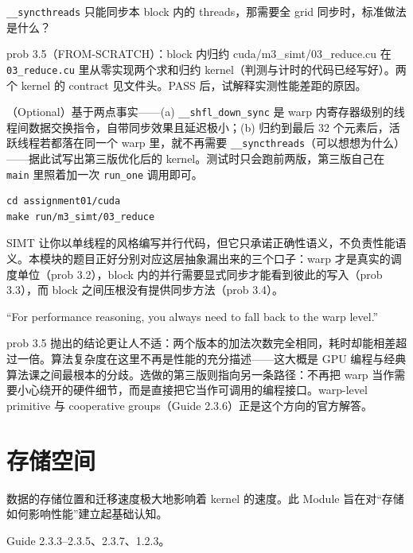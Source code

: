 \documentclass[11pt,a4paper,fontset=none]{ctexart}
\begin{document}
\texttt{\_\_syncthreads} 只能同步本 block 内的 threads，那需要全 grid 同步时，标准做法是什么？

\begin{capstone}{prob 3.5（FROM-SCRATCH）：block 内归约 \hfill {\footnotesize\ttfamily cuda/m3\_simt/03\_reduce.cu}}
在 \texttt{03\_reduce.cu} 里从零实现两个求和归约 kernel（判测与计时的代码已经写好）。两个 kernel 的 contract 见文件头。PASS 后，试解释实测性能差距的原因。

（Optional）基于两点事实——(a) \texttt{\_\_shfl\_down\_sync} 是 warp 内寄存器级别的线程间数据交换指令，自带同步效果且延迟极小；(b) 归约到最后 32 个元素后，活跃线程若都落在同一个 warp 里，就不再需要 \texttt{\_\_syncthreads}（可以想想为什么）——据此试写出第三版优化后的 kernel。测试时只会跑前两版，第三版自己在 \texttt{main} 里照着加一次 \texttt{run\_one} 调用即可。
\end{capstone}

\begin{lstlisting}
cd assignment01/cuda
make run/m3_simt/03_reduce
\end{lstlisting}

\begin{lookback}
SIMT 让你以单线程的风格编写并行代码，但它只承诺正确性语义，不负责性能语义。本模块的题目正好分别对应这层抽象漏出来的三个口子：warp 才是真实的调度单位（prob 3.2），block 内的并行需要显式同步才能看到彼此的写入（prob 3.3），而 block 之间压根没有提供同步方法（prob 3.4）。

``For performance reasoning, you always need to fall back to the warp level.''

prob 3.5 抛出的结论更让人不适：两个版本的加法次数完全相同，耗时却能相差超过一倍。算法复杂度在这里不再是性能的充分描述——这大概是 GPU 编程与经典算法课之间最根本的分歧。选做的第三版则指向另一条路径：不再把 warp 当作需要小心绕开的硬件细节，而是直接把它当作可调用的编程接口。warp-level primitive 与 cooperative groups（Guide 2.3.6）正是这个方向的官方解答。
\end{lookback}

\section{存储空间}

数据的存储位置和迁移速度极大地影响着 kernel 的速度。此 Module 旨在对“存储如何影响性能”建立起基础认知。

\begin{reading}
Guide 2.3.3--2.3.5、2.3.7、1.2.3。
\end{reading}
\end{document}

